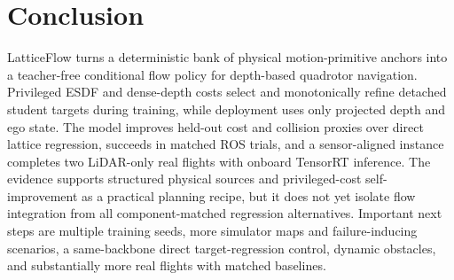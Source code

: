 \section{Conclusion}

LatticeFlow turns a deterministic bank of physical motion-primitive anchors into a teacher-free conditional flow policy for depth-based quadrotor navigation. Privileged ESDF and dense-depth costs select and monotonically refine detached student targets during training, while deployment uses only projected depth and ego state. The model improves held-out cost and collision proxies over direct lattice regression, succeeds in matched ROS trials, and a sensor-aligned instance completes two LiDAR-only real flights with onboard TensorRT inference. The evidence supports structured physical sources and privileged-cost self-improvement as a practical planning recipe, but it does not yet isolate flow integration from all component-matched regression alternatives. Important next steps are multiple training seeds, more simulator maps and failure-inducing scenarios, a same-backbone direct target-regression control, dynamic obstacles, and substantially more real flights with matched baselines.
